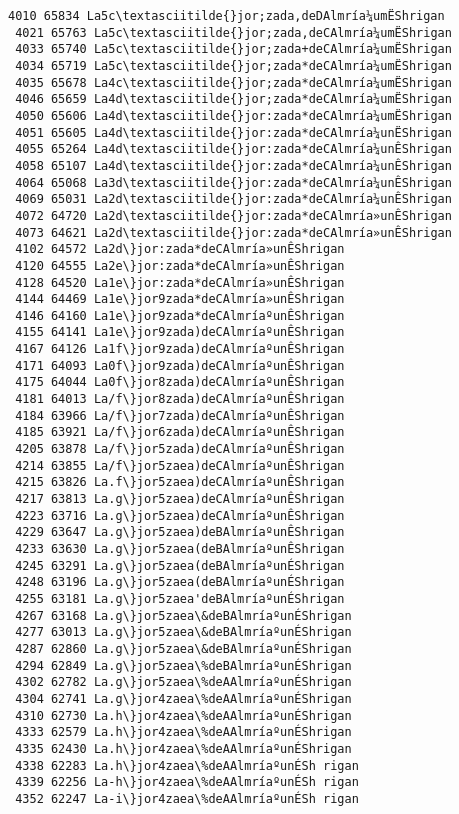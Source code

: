 \documentclass[11pt]{article}
\begin{document}
\begin{Verbatim}[commandchars=\\\{\}]
 4010 65834 La5c\textasciitilde{}jor;zada,deDAlmría¼umËShrigan
 4021 65763 La5c\textasciitilde{}jor;zada,deCAlmría¼umËShrigan
 4033 65740 La5c\textasciitilde{}jor;zada+deCAlmría¼umËShrigan
 4034 65719 La5c\textasciitilde{}jor;zada*deCAlmría¼umËShrigan
 4035 65678 La4c\textasciitilde{}jor;zada*deCAlmría¼umËShrigan
 4046 65659 La4d\textasciitilde{}jor;zada*deCAlmría¼umËShrigan
 4050 65606 La4d\textasciitilde{}jor:zada*deCAlmría¼umËShrigan
 4051 65605 La4d\textasciitilde{}jor:zada*deCAlmría¼unËShrigan
 4055 65264 La4d\textasciitilde{}jor:zada*deCAlmría¼unÊShrigan
 4058 65107 La4d\textasciitilde{}jor:zada*deCAlmría¼unÊShrigan
 4064 65068 La3d\textasciitilde{}jor:zada*deCAlmría¼unÊShrigan
 4069 65031 La2d\textasciitilde{}jor:zada*deCAlmría¼unÊShrigan
 4072 64720 La2d\textasciitilde{}jor:zada*deCAlmría»unÊShrigan
 4073 64621 La2d\textasciitilde{}jor:zada*deCAlmría»unÊShrigan
 4102 64572 La2d\}jor:zada*deCAlmría»unÊShrigan
 4120 64555 La2e\}jor:zada*deCAlmría»unÊShrigan
 4128 64520 La1e\}jor:zada*deCAlmría»unÊShrigan
 4144 64469 La1e\}jor9zada*deCAlmría»unÊShrigan
 4146 64160 La1e\}jor9zada*deCAlmríaºunÊShrigan
 4155 64141 La1e\}jor9zada)deCAlmríaºunÊShrigan
 4167 64126 La1f\}jor9zada)deCAlmríaºunÊShrigan
 4171 64093 La0f\}jor9zada)deCAlmríaºunÊShrigan
 4175 64044 La0f\}jor8zada)deCAlmríaºunÊShrigan
 4181 64013 La/f\}jor8zada)deCAlmríaºunÊShrigan
 4184 63966 La/f\}jor7zada)deCAlmríaºunÊShrigan
 4185 63921 La/f\}jor6zada)deCAlmríaºunÊShrigan
 4205 63878 La/f\}jor5zada)deCAlmríaºunÊShrigan
 4214 63855 La/f\}jor5zaea)deCAlmríaºunÊShrigan
 4215 63826 La.f\}jor5zaea)deCAlmríaºunÊShrigan
 4217 63813 La.g\}jor5zaea)deCAlmríaºunÊShrigan
 4223 63716 La.g\}jor5zaea)deCAlmríaºunÊShrigan
 4229 63647 La.g\}jor5zaea)deBAlmríaºunÊShrigan
 4233 63630 La.g\}jor5zaea(deBAlmríaºunÊShrigan
 4245 63291 La.g\}jor5zaea(deBAlmríaºunÉShrigan
 4248 63196 La.g\}jor5zaea(deBAlmríaºunÉShrigan
 4255 63181 La.g\}jor5zaea'deBAlmríaºunÉShrigan
 4267 63168 La.g\}jor5zaea\&deBAlmríaºunÉShrigan
 4277 63013 La.g\}jor5zaea\&deBAlmríaºunÉShrigan
 4287 62860 La.g\}jor5zaea\&deBAlmríaºunÉShrigan
 4294 62849 La.g\}jor5zaea\%deBAlmríaºunÉShrigan
 4302 62782 La.g\}jor5zaea\%deAAlmríaºunÉShrigan
 4304 62741 La.g\}jor4zaea\%deAAlmríaºunÉShrigan
 4310 62730 La.h\}jor4zaea\%deAAlmríaºunÉShrigan
 4333 62579 La.h\}jor4zaea\%deAAlmríaºunÉShrigan
 4335 62430 La.h\}jor4zaea\%deAAlmríaºunÉShrigan
 4338 62283 La.h\}jor4zaea\%deAAlmríaºunÉSh rigan
 4339 62256 La-h\}jor4zaea\%deAAlmríaºunÉSh rigan
 4352 62247 La-i\}jor4zaea\%deAAlmríaºunÉSh rigan

\end{Verbatim}
\end{document}
